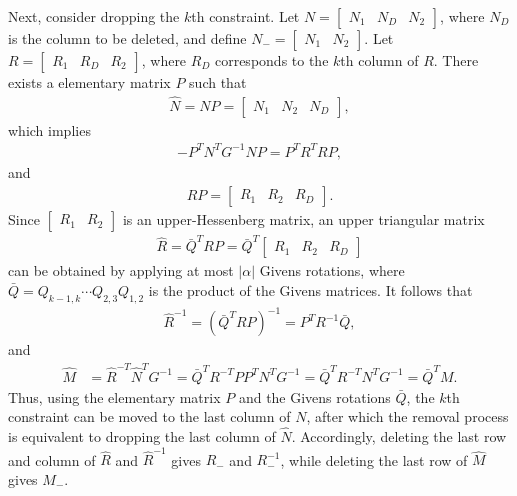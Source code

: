 \documentclass{article}
\begin{document}
	Next, consider dropping the $k$th constraint.  
	Let $N = \begin{bmatrix}
		N_{1} & N_{D} & N_{2}
	\end{bmatrix}$, where $N_{D}$ is the column to be deleted, and define $N_{-} = \begin{bmatrix}
		N_{1} & N_{2}
	\end{bmatrix}$.  
	Let $R = \begin{bmatrix}
		R_{1} & R_{D} & R_{2}
	\end{bmatrix}$, where $R_{D}$ corresponds to the $k$th column of $R$.  
	There exists a elementary matrix $P$ such that
	\begin{align*}
	\hat{N} = NP = \begin{bmatrix}
		N_{1} & N_{2} & N_{D}
	\end{bmatrix},
	\end{align*}
	which implies
	\begin{align*}
		-P^{T}N^{T}G^{-1}NP = P^{T}R^{T}RP,
	\end{align*}
	and
	\begin{align*}
	RP = \begin{bmatrix}
		R_{1} & R_{2} & R_{D}
	\end{bmatrix}.
	\end{align*}
	Since $\begin{bmatrix}
		R_{1} & R_{2}
	\end{bmatrix}$ is an upper-Hessenberg matrix, an upper triangular matrix
	\begin{align*}
	\hat{R} = \bar{Q}^{T}RP = \bar{Q}^{T}\begin{bmatrix}
		R_{1} & R_{2} & R_{D}
	\end{bmatrix}
	\end{align*}
	can be obtained by applying at most $|\alpha|$ Givens rotations, where 
	\(
	\bar{Q} = Q_{k-1,k}\cdots Q_{2,3}Q_{1,2}
	\)
	is the product of the Givens matrices.  
	It follows that
	\begin{align*}
	\hat{R}^{-1} = (\bar{Q}^{T}RP)^{-1} = P^{T}R^{-1}\bar{Q},
	\end{align*}
	and
	\begin{align*}
		\hat{M} 
		&= \hat{R}^{-T}\hat{N}^{T}G^{-1}
		= \bar{Q}^{T}R^{-T}PP^{T}N^{T}G^{-1}
		= \bar{Q}^{T}R^{-T}N^{T}G^{-1}
		= \bar{Q}^{T}M.
	\end{align*}
	Thus, using the elementary matrix $P$ and the Givens rotations $\bar{Q}$, the $k$th constraint can be moved to the last column of $N$, after which the removal process is equivalent to dropping the last column of $\hat{N}$.  
	Accordingly, deleting the last row and column of $\hat{R}$ and $\hat{R}^{-1}$ gives $R_{-}$ and $R_{-}^{-1}$, while deleting the last row of $\hat{M}$ gives $M_{-}$.
	
\end{document}
